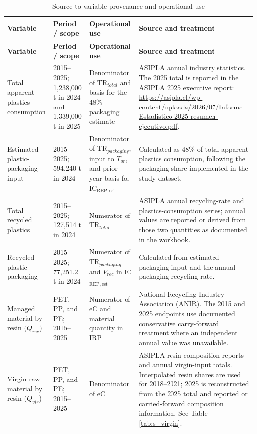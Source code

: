 \documentclass[review,10pt]{elsarticle}
\begin{document}
\begin{longtable}{|L{3.0cm}|L{3.0cm}|L{3.6cm}|L{5.2cm}|}
\caption{Source-to-variable provenance and operational use}
\label{tab:s_provenance}\\
\hline
\textbf{Variable} & \textbf{Period / scope} & \textbf{Operational use} & \textbf{Source and treatment} \\
\hline
\endfirsthead
\hline
\textbf{Variable} & \textbf{Period / scope} & \textbf{Operational use} & \textbf{Source and treatment} \\
\hline
\endhead
Total apparent plastics consumption & 2015--2025; 1,238,000 t in 2024 and 1,339,000 t in 2025 & Denominator of TR$_{total}$ and basis for the 48\% packaging estimate & ASIPLA annual industry statistics. The 2025 total is reported in the ASIPLA 2025 executive report: \url{https://asipla.cl/wp-content/uploads/2026/07/Informe-Estadistico-2025-resumen-ejecutivo.pdf}. \\
\hline
Estimated plastic-packaging input & 2015--2025; 594,240 t in 2024 & Denominator of TR$_{packaging}$, input to $T_{gr}$, and prior-year basis for IC$_{\mathrm{REP,est}}$ & Calculated as 48\% of total apparent plastics consumption, following the packaging share implemented in the study dataset. \\
\hline
Total recycled plastics & 2015--2025; 127,514 t in 2024 & Numerator of TR$_{total}$ & ASIPLA annual recycling-rate and plastics-consumption series; annual values are reported or derived from those two quantities as documented in the workbook. \\
\hline
Recycled plastic packaging & 2015--2025; 77,251.2 t in 2024 & Numerator of TR$_{packaging}$ and $V_{rec}$ in IC$_{\mathrm{REP,est}}$ & Calculated from estimated packaging input and the annual packaging recycling rate. \\
\hline
Managed material by resin ($Q_{rec}$) & PET, PP, and PE; 2015--2025 & Numerator of eC and material quantity in IRP & National Recycling Industry Association (ANIR). The 2015 and 2025 endpoints use documented conservative carry-forward treatment where an independent annual value was unavailable. \\
\hline
Virgin raw material by resin ($Q_{vir}$) & PET, PP, and PE; 2015--2025 & Denominator of eC & ASIPLA resin-composition reports and annual virgin-input totals. Interpolated resin shares are used for 2018--2021; 2025 is reconstructed from the 2025 total and reported or carried-forward composition information. See Table \ref{tab:s_virgin}. \\

\end{longtable}
\end{document}
